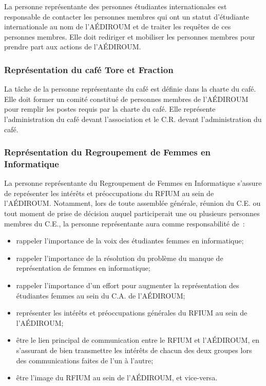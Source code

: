 \documentclass{aediroum}
\begin{document}
La personne représentante des personnes étudiantes internationales est responsable de contacter les personnes membres qui ont un statut d'étudiante internationale au nom de l'AÉDIROUM et de traiter les requêtes de ces personnes membres. Elle doit rediriger et mobiliser les personnes membres pour prendre part aux actions de l'AÉDIROUM.

\subsubsection{Représentation du café Tore et Fraction}\label{sec:representant-du-cafe-etudiant-math-info}

La tâche de la personne représentante du café est définie dans la charte du café. Elle doit former un comité constitué de personnes membres de l'AÉDIROUM pour remplir les postes requis par la charte du café. Elle représente l'administration du café devant l'association et le C.R. devant l'administration du café.

\subsubsection{Représentation du Regroupement de Femmes en Informatique}\label{sec:representant-e-regroupement-de-femmes-en-informatique}

La personne représentante du Regroupement de Femmes en Informatique s’assure de représenter les intérêts et préoccupations du RFIUM au sein de l’AÉDIROUM. Notamment, lors de toute assemblée générale, réunion du C.E. ou tout moment de prise de décision auquel participerait une ou plusieurs personnes membres du C.E., la personne représentante aura comme responsabilité de~:
\begin{itemize}
    \item rappeler l'importance de la voix des étudiantes femmes en informatique;
    \item rappeler l'importance de la résolution du problème du manque de représentation de femmes en informatique;
    \item rappeler l'importance d'un effort pour augmenter la représentation des étudiantes femmes au sein du C.A. de l'AÉDIROUM;
    \item représenter les intérêts et préoccupations générales du RFIUM au sein de l'AÉDIROUM;
    \item être le lien principal de communication entre le RFIUM et l'AÉDIROUM, en s'assurant de bien transmettre les intérêts de chacun des deux groupes lors des communications faites de l'un à l'autre;
    \item être l'image du RFIUM au sein de l'AÉDIROUM, et vice-versa.
\end{itemize}
\end{document}
